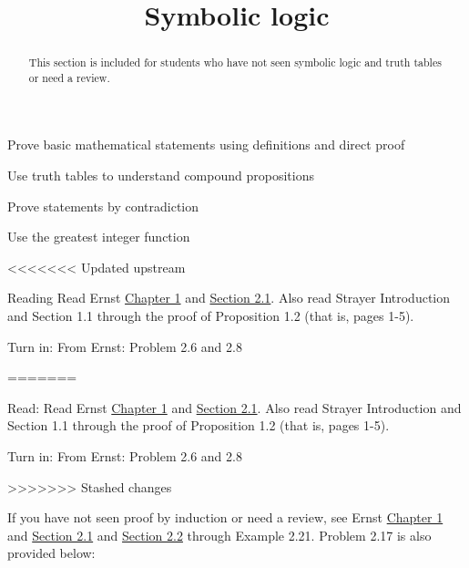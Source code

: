 \documentclass{ximera}
\title{Symbolic logic}
\begin{document}
\begin{abstract}
  This section is included for students who have not seen symbolic logic and truth tables or need a review.
\end{abstract}
\maketitle


\begin{obj}
  \item Prove basic mathematical statements using definitions and direct proof
  \item Use truth tables to understand compound propositions
  \item Prove statements by contradiction
  \item Use the greatest integer function
\end{obj}
 

<<<<<<< Updated upstream
\begin{instructorNotes}
  \begin{pre}
    \item[Reading]  Read Ernst  \href{https://danaernst.com/IBL-IntroToProof/pretext/chap_intro.html}{Chapter 1} and \href{https://danaernst.com/IBL-IntroToProof/pretext/sec_baby_number_theory.html}{Section 2.1}. Also read Strayer Introduction and Section 1.1 through the proof of Proposition 1.2 (that is, pages 1-5).
  
    \item[Turn in:] From Ernst: Problem 2.6 and 2.8
  \end{pre}
\end{instructorNotes}
=======
\begin{pre}
  \item[Read:]  Read Ernst  \href{https://danaernst.com/IBL-IntroToProof/pretext/chap_intro.html}{Chapter 1} and \href{https://danaernst.com/IBL-IntroToProof/pretext/sec_baby_number_theory.html}{Section 2.1}. Also read Strayer Introduction and Section 1.1 through the proof of Proposition 1.2 (that is, pages 1-5).
  
  \item[Turn in:] From Ernst: Problem 2.6 and 2.8
\end{pre}
>>>>>>> Stashed changes


If you have not seen proof by induction or need a review, see Ernst  \href{https://danaernst.com/IBL-IntroToProof/pretext/chap_intro.html}{Chapter 1} and \href{https://danaernst.com/IBL-IntroToProof/pretext/sec_baby_number_theory.html}{Section 2.1}
and \href{https://danaernst.com/IBL-IntroToProof/pretext/sec_Intro_to_Logic.html}{Section 2.2} through Example 2.21. Problem 2.17 is also provided below:
\end{document}
